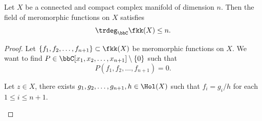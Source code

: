     \begin{theorem}\label{thm:Siegel_theorem_on_function_fields_of_complex_manifolds}
        Let \(X\) be a connected and compact complex manifold of dimension \(n\).
        Then the field of meromorphic functions on \(X\) satisfies
        \[
            \trdeg_{\bbC} \fkk(X) \leq n.
        \]
    \end{theorem}
    \begin{proof}
        Let \(\{f_1, f_2, \ldots, f_{n+1}\} \subset \fkk(X)\) be meromorphic functions on \(X\).
        We want to find \(P \in \bbC[x_1, x_2, \ldots, x_{n+1}] \setminus \{0\}\) such that
        \[ P(f_1, f_2, \ldots, f_{n+1}) = 0. \]

        \begin{step}
            Let \(z \in X\), there exists \(g_1, g_2, \ldots, g_{n+1}, h \in \Hol(X)\) such that \(f_i = g_i / h\) for each \(1 \leq i \leq n+1\).
        \end{step}

    \end{proof}



